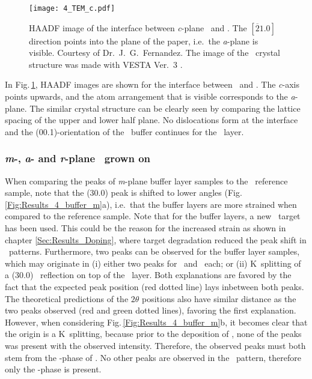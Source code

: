 \begin{figure}
    \centering
    \texttt{[image: 4\_TEM\_c.pdf]}
    \caption{
        \acrshort{HAADF} image of the interface between \textit{c}-plane \cro\ and \agao.
        The $[\overline{2}1.0]$ direction points into the plane of the paper, i.e.\ the \textit{a}-plane is visible.
        Courtesy of Dr.\ J.\ G.\  Fernandez.
        The image of the \agao\ crystal structure was made with VESTA Ver.~3 \cite{momma2011}.
    }
    \label{Fig:Results_4_TEM_c}
\end{figure}
In Fig.\,\ref{Fig:Results_4_TEM_c}, \acrshort{HAADF} images are shown for the interface between \agao\ and \cro.
The \textit{c}-axis points upwards, and the atom arrangement that is visible corresponds to the \textit{a}-plane.
The similar crystal structure can be clearly seen by comparing the lattice spacing of the upper and lower half plane.
No dislocations form at the interface and the (00.1)-orientation of the \cro\ buffer continues for the \gao\ layer.


\subsubsection*{\textit{m}-, \textit{a}- and \textit{r}-plane \texorpdfstring{\agao}{a-Ga2O3}\ grown on \texorpdfstring{\cro}
{Cr2O3}}


When comparing the peaks of \textit{m}-plane buffer layer samples to the \cro\ reference sample, note that the (30.0) peak is shifted to lower angles (Fig.\,\ref{Fig:Results_4_buffer_m}a), i.e.\ that the buffer layers are more strained when compared to the reference sample.
Note that for the buffer layers, a new \cro\ target has been used.
This could be the reason for the increased strain as shown in chapter \ref{Sec:Results_Doping}, where target degradation reduced the peak shift in \thetaomega\ patterns.
Furthermore, two peaks can be observed for the buffer layer samples, which may originate in (i) either two peaks for \cro\ and \agao\ each; or (ii) K\textalpha\ splitting of a (30.0) \agao\ reflection on top of the \cro\ layer.
Both explanations are favored by the fact that the expected peak position (red dotted line) lays inbetween both peaks.
The theoretical predictions of the $2\theta$ positions also have similar distance as the two peaks observed (red and green dotted lines), favoring the first explanation.
However, when considering Fig.\,\ref{Fig:Results_4_buffer_m}b, it becomes clear that the origin is a K\textalpha\ splitting, because prior to the deposition of \gao, none of the peaks was present with the observed intensity.
Therefore, the observed peaks must both stem from the \textalpha-phase of \gao.
No other peaks are observed in the \thetaomega\ pattern, therefore only the \textalpha-phase is present.


